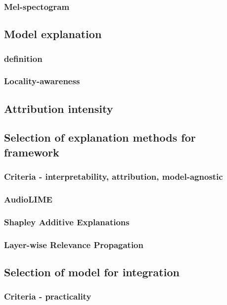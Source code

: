 \documentclass[
    bindingoffset=5mm,  %
    footnoteindent=3mm, %
    hyphenation=true    %
]{src/wut-thesis}
\begin{document}
\subsubsection{Mel-spectogram}

\subsection{Model explanation}
\subsubsection{definition}
\subsubsection{Locality-awareness}
\subsection{Attribution intensity} \label{ch2:AttrIntensity}

\subsection{Selection of explanation methods for framework}
\subsubsection{Criteria - interpretability, attribution, model-agnostic}
\subsubsection{AudioLIME} \label{ch1:audioLIME}
\subsubsection{Shapley Additive Explanations} \label{ch1:ShapMethod}
\subsubsection{Layer-wise Relevance Propagation} \label{ch1:LrpMethod}

\subsection{Selection of model for integration} \label{ch1:ModelSelection}
\subsubsection{Criteria - practicality}
\end{document}
